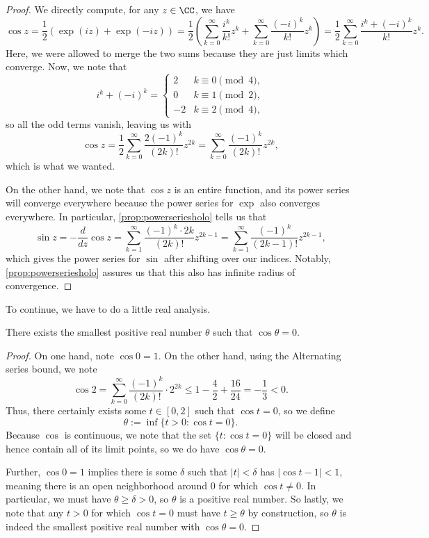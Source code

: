 \begin{proof}
	We directly compute, for any $z\in\CC$, we have
	\[\cos z=\frac12(\exp(iz)+\exp(-iz))=\frac12\left(\sum_{k=0}^\infty\frac{i^k}{k!}z^k+\sum_{k=0}^\infty\frac{(-i)^k}{k!}z^k\right)=\frac12\sum_{k=0}^\infty\frac{i^k+(-i)^k}{k!}z^k.\]
	Here, we were allowed to merge the two sums because they are just limits which converge. Now, we note that
	\[i^k+(-i)^k=\begin{cases}
		2 & k\equiv0\pmod4, \\
		0 & k\equiv1\pmod2, \\
		-2 & k\equiv2\pmod4,
	\end{cases}\]
	so all the odd terms vanish, leaving us with
	\[\cos z=\frac12\sum_{k=0}^\infty\frac{2(-1)^k}{(2k)!}z^{2k}=\sum_{k=0}^\infty\frac{(-1)^k}{(2k)!}z^{2k},\]
	which is what we wanted.

	On the other hand, we note that $\cos z$ is an entire function, and its power series will converge everywhere because the power series for $\exp$ also converges everywhere. In particular, \autoref{prop:powerseriesholo} tells us that
	\[\sin z=-\frac d{dz}\cos z=\sum_{k=1}^\infty\frac{(-1)^k\cdot2k}{(2k)!}z^{2k-1}=\sum_{k=1}^\infty\frac{(-1)^k}{(2k-1)!}z^{2k-1},\]
	which gives the power series for $\sin$ after shifting over our indices. Notably, \autoref{prop:powerseriesholo} assures us that this also has infinite radius of convergence.
\end{proof}
To continue, we have to do a little real analysis.
\begin{lemma} \label{lem:babyperiod}
	There exists the smallest positive real number $\theta$ such that $\cos\theta=0$.
\end{lemma}
\begin{proof}
	On one hand, note $\cos0=1$. On the other hand, using the Alternating series bound, we note
	\[\cos2=\sum_{k=0}^\infty\frac{(-1)^k}{(2k)!}\cdot2^{2k}\le1-\frac42+\frac{16}{24}=-\frac13<0.\]
	Thus, there certainly exists some $t\in[0,2]$ such that $\cos t=0$, so we define
	\[\theta:=\inf\{t>0:\cos t=0\}.\]
	Because $\cos$ is continuous, we note that the set $\{t:\cos t=0\}$ will be closed and hence contain all of its limit points, so we do have $\cos\theta=0$.
	
	Further, $\cos0=1$ implies there is some $\delta$ such that $|t|<\delta$ has $|\cos t-1|<1$, meaning there is an open neighborhood around $0$ for which $\cos t\ne0$. In particular, we must have $\theta\ge\delta>0$, so $\theta$ is a positive real number. So lastly, we note that any $t>0$ for which $\cos t=0$ must have $t\ge\theta$ by construction, so $\theta$ is indeed the smallest positive real number with $\cos\theta=0$.
\end{proof}
